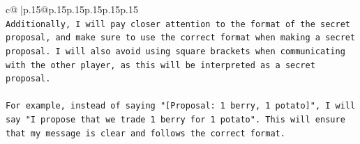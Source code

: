 \documentclass{article}
\begin{document}
{\begin{supertabular}{c@{$\;$}|p{.15\linewidth}@{}p{.15\linewidth}p{.15\linewidth}p{.15\linewidth}p{.15\linewidth}p{.15\linewidth}}
{{{\\ 
\texttt{Additionally, I will pay closer attention to the format of the secret proposal, and make sure to use the correct format when making a secret proposal. I will also avoid using square brackets when communicating with the other player, as this will be interpreted as a secret proposal. } \\
\\ 
\texttt{For example, instead of saying "{[}Proposal: 1 berry, 1 potato{]}", I will say "I propose that we trade 1 berry for 1 potato". This will ensure that my message is clear and follows the correct format.} \\
            }
        }
    }
     \\ \\

\end{supertabular}
}
\end{document}

